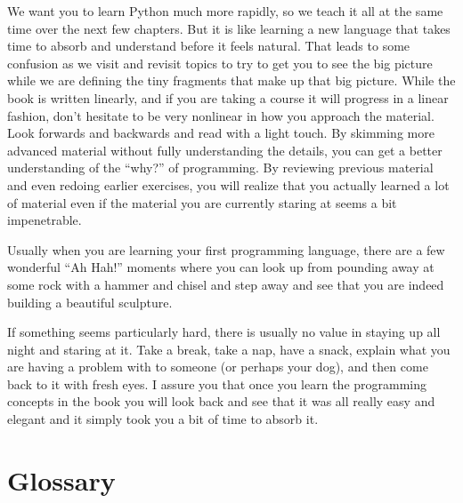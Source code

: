 We want you to learn Python much more rapidly, so we teach it all at the same time
over the next few chapters.  
But it is like learning a new language that takes time to absorb and understand
before it feels natural.
That leads to some confusion as we visit and revisit
topics to try to get you to see the big picture while we are defining the tiny
fragments that make up that big picture.  While the book is written linearly, and
if you are taking a course it will progress in a linear fashion, don't hesitate
to be very nonlinear in how you approach the material.  Look forwards and backwards
and read with a light touch.  By skimming more advanced material without 
fully understanding the details, you can get a better understanding of the ``why?'' 
of programming.  By reviewing previous material and even redoing earlier 
exercises, you will realize that you actually learned a lot of material even 
if the material you are currently staring at seems a bit impenetrable.

Usually when you are learning your first programming language, there are a few
wonderful ``Ah Hah!'' moments where you can look up from pounding away at some rock
with a hammer and chisel and step away and see that you are indeed building 
a beautiful sculpture.

If something seems particularly hard, there is usually no value in staying up all 
night and staring at it.   Take a break, take a nap, have a snack, explain what you 
are having a problem with to someone (or perhaps your dog), and then come back to it with
fresh eyes.  I assure you that once you learn the programming concepts in the book
you will look back and see that it was all really easy and elegant and it simply 
took you a bit of time to absorb it.

\section{Glossary}

